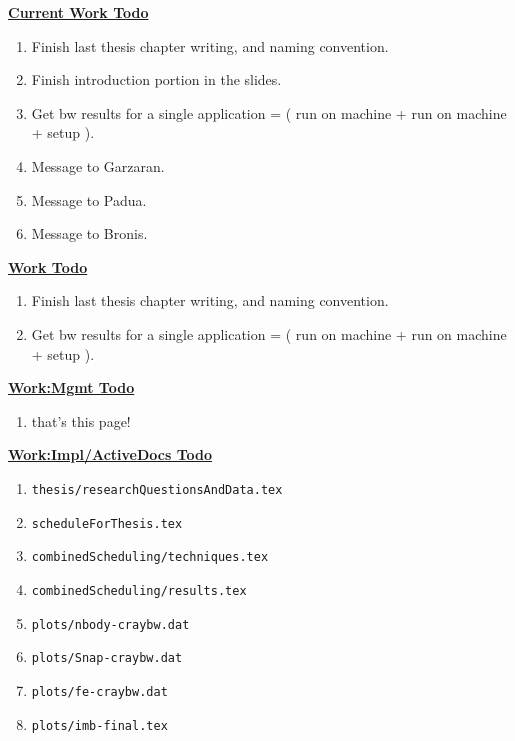 \documentclass[12pt] {article}
\begin{document}
 

\underline{\textbf{ Current Work Todo}}\\
\begin{enumerate}
\tiny \item \tiny Finish last thesis chapter writing, and naming convention. 
\item \tiny Finish introduction portion in the slides. 
\item \tiny Get bw results for a single application  = ( run on machine + run on machine  + setup ). 
\item \tiny Message to Garzaran. 
\item \tiny Message to Padua. 
\item \tiny Message to Bronis. 
\end{enumerate}

\underline{\textbf{Work Todo}}\\
\begin{enumerate}
\tiny \item \tiny Finish last thesis chapter writing, and naming convention. \item \tiny Get bw results for a single application  = ( run on machine + run on machine  + setup ). 
\end{enumerate}

\underline{\textbf{Work:Mgmt Todo}}\\
\begin{enumerate} 
\item that's this page! 
\end{enumerate} 

\underline{\textbf{Work:Impl/ActiveDocs Todo}}\\
\begin{enumerate} 
\item \tiny \texttt{thesis/researchQuestionsAndData.tex}
\item \tiny \texttt{scheduleForThesis.tex}
\item \tiny \texttt{combinedScheduling/techniques.tex}
\item \tiny \texttt{combinedScheduling/results.tex}
\item \tiny \texttt{plots/nbody-craybw.dat}
\item \tiny \texttt{plots/Snap-craybw.dat}
\item \tiny \texttt{plots/fe-craybw.dat}
\item \tiny \texttt{plots/imb-final.tex}
\end{enumerate} 

\end{document}
